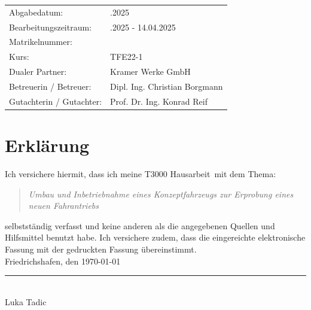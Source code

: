 \documentclass[a4paper, 12pt]{article} %
\newcommand{\titel}{Umbau und Inbetriebnahme eines Konzeptfahrzeugs zur Erprobung eines neuen Fahrantriebs}
\newcommand{\arbeit}{T3000 Hausarbeit}
\newcommand{\autor}{Luka Tadic}
\newcommand{\abgabe}{14.04.2025}
\newcommand{\bearbeitungszeitraum}{19.01.2025 - 14.04.2025}
\newcommand{\matrikelnr}{5726700}
\newcommand{\kurs}{TFE22-1}
\newcommand{\firma}{Kramer Werke GmbH}
\newcommand{\betreuerfirma}{Dipl. Ing. Christian Borgmann}
\newcommand{\gutachterdhbw}{Prof. Dr. Ing. Konrad Reif}
\begin{document}
\begin{titlepage}
\begin{center}
\end{center}

\begin{center}
{\fontsize{12pt}{14pt}\selectfont
\begin{tabular}{ll}
Abgabedatum:                    & \quad \abgabe \\  
Bearbeitungszeitraum:           & \quad \bearbeitungszeitraum \\  
Matrikelnummer:                 & \quad \matrikelnr \\  
Kurs:                           & \quad \kurs \\  
Dualer Partner:                 & \quad \firma \\ %
Betreuerin / Betreuer:          & \quad \betreuerfirma \\  
Gutachterin / Gutachter:        & \quad \gutachterdhbw \\ [2ex]
\end{tabular}
}
\end{center}

\end{titlepage}

\clearpage

\pagestyle{scrheadings}  %
\hypersetup{pageanchor=true}



\section*{Erklärung}

Ich versichere hiermit, dass ich meine \arbeit\ mit dem Thema:

\begin{quote}
    \textit{\titel}
\end{quote}

selbstständig verfasst und keine anderen als die angegebenen Quellen und Hilfsmittel benutzt habe.  
Ich versichere zudem, dass die eingereichte elektronische Fassung mit der gedruckten Fassung übereinstimmt.\\[6ex]

Friedrichshafen, den \today \\[1ex]
\rule[-0.2cm]{5cm}{0.5pt} \\  
\autor \\[10ex]
\end{document}
